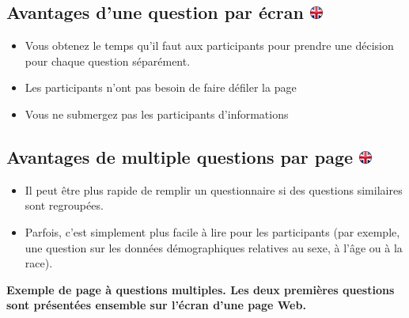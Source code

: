 \documentclass[
]{book}
\providecommand{\tightlist}{%
  \setlength{\itemsep}{0pt}\setlength{\parskip}{0pt}}
\begin{document}
\hypertarget{avantages-dune-question-par-uxe9cran}{%
\subsection[Avantages d'une question par écran ]{\texorpdfstring{Avantages d'une question par écran \href{https://www.psytoolkit.org/doc3.4.0/online-survey-syntax.html\#_advantages_of_one_question_per_screen}{\protect\includegraphics{img/ukflag.png}}}{Avantages d'une question par écran }}\label{avantages-dune-question-par-uxe9cran}}

\begin{itemize}
\tightlist
\item
  Vous obtenez le temps qu'il faut aux participants pour prendre une décision pour chaque question séparément.
\item
  Les participants n'ont pas besoin de faire défiler la page
\item
  Vous ne submergez pas les participants d'informations
\end{itemize}

\hypertarget{avantages-de-multiple-questions-par-page}{%
\subsection[Avantages de multiple questions par page ]{\texorpdfstring{Avantages de multiple questions par page \href{https://www.psytoolkit.org/doc3.4.0/online-survey-syntax.html\#_advantages_of_multiple_questions_per_screen}{\protect\includegraphics{img/ukflag.png}}}{Avantages de multiple questions par page }}\label{avantages-de-multiple-questions-par-page}}

\begin{itemize}
\tightlist
\item
  Il peut être plus rapide de remplir un questionnaire si des questions similaires sont regroupées.
\item
  Parfois, c'est simplement plus facile à lire pour les participants (par exemple, une question sur les données démographiques relatives au sexe, à l'âge ou à la race).
\end{itemize}

\textbf{Exemple de page à questions multiples. Les deux premières questions sont présentées ensemble sur l'écran d'une page Web.}
\end{document}
